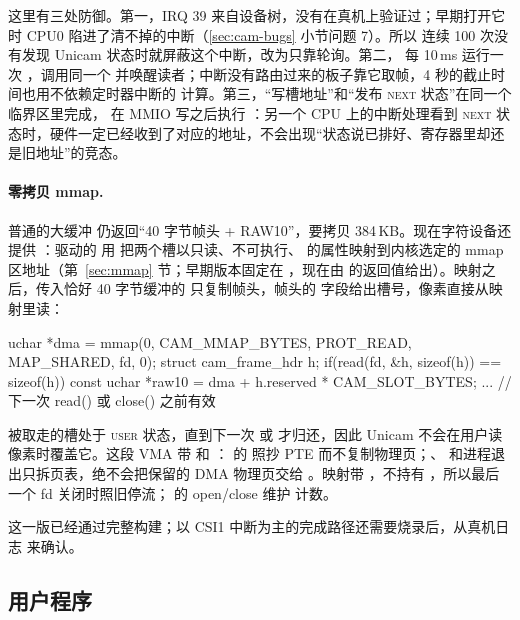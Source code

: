 这里有三处防御。第一，IRQ 39 来自设备树，没有在真机上验证过；早期打开它时 CPU0 陷进了清不掉的中断（\ref{sec:cam-bugs} 小节问题 7）。所以  连续 100 次没有发现 Unicam 状态时就屏蔽这个中断，改为只靠轮询。第二， 每 10\,ms 运行一次 ，调用同一个  并唤醒读者；中断没有路由过来的板子靠它取帧，4 秒的截止时间也用不依赖定时器中断的  计算。第三，“写槽地址”和“发布 \textsc{next} 状态”在同一个  临界区里完成， 在 MMIO 写之后执行 ：另一个 CPU 上的中断处理看到 \textsc{next} 状态时，硬件一定已经收到了对应的地址，不会出现“状态说已排好、寄存器里却还是旧地址”的竞态。

\paragraph{零拷贝 mmap.} 普通的大缓冲  仍返回“40 字节帧头 + RAW10”，要拷贝 384\,KB。现在字符设备还提供 ：驱动的  用  把两个槽以只读、不可执行、 的属性映射到内核选定的 mmap 区地址（第~\ref{sec:mmap} 节；早期版本固定在 ，现在由  的返回值给出）。映射之后，传入恰好 40 字节缓冲的  只复制帧头，帧头的  字段给出槽号，像素直接从映射里读：

\begin{ccode}
uchar *dma = mmap(0, CAM_MMAP_BYTES, PROT_READ, MAP_SHARED, fd, 0);
struct cam_frame_hdr h;
if(read(fd, &h, sizeof(h)) == sizeof(h)){
  const uchar *raw10 = dma + h.reserved * CAM_SLOT_BYTES;
  ...                                   // 下一次 read() 或 close() 之前有效
}
\end{ccode}

被取走的槽处于 \textsc{user} 状态，直到下一次  或  才归还，因此 Unicam 不会在用户读像素时覆盖它。这段 VMA 带  和 ： 的  照抄 PTE 而不复制物理页；、 和进程退出只拆页表，绝不会把保留的 DMA 物理页交给 。映射带 ，不持有 ，所以最后一个 fd 关闭时照旧停流； 的 open/close 维护  计数。

这一版已经通过完整构建；以 CSI1 中断为主的完成路径还需要烧录后，从真机日志  来确认。

\subsection{用户程序 }

